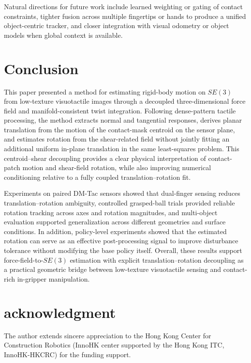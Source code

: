 \documentclass[letterpaper,10pt,journal,twoside]{IEEEtran}
\begin{document}
Natural directions for future work include learned weighting or gating of contact constraints, tighter fusion across multiple fingertips or hands to produce a unified object-centric tracker, and closer integration with visual odometry or object models when global context is available.

\section{Conclusion}
\label{sec:conclusion}

This paper presented a method for estimating rigid-body motion on $SE(3)$ from low-texture visuotactile images through a decoupled three-dimensional force field and manifold-consistent twist integration. Following dense-pattern tactile processing, the method extracts normal and tangential responses, derives planar translation from the motion of the contact-mask centroid on the sensor plane, and estimates rotation from the shear-related field without jointly fitting an additional uniform in-plane translation in the same least-squares problem. This centroid--shear decoupling provides a clear physical interpretation of contact-patch motion and shear-field rotation, while also improving numerical conditioning relative to a fully coupled translation--rotation fit.

Experiments on paired DM-Tac sensors showed that dual-finger sensing reduces translation--rotation ambiguity, controlled grasped-ball trials provided reliable rotation tracking across axes and rotation magnitudes, and multi-object evaluation supported generalization across different geometries and surface conditions. In addition, policy-level experiments showed that the estimated rotation can serve as an effective post-processing signal to improve disturbance tolerance without modifying the base policy itself. Overall, these results support force-field-to-$SE(3)$ estimation with explicit translation--rotation decoupling as a practical geometric bridge between low-texture visuotactile sensing and contact-rich in-gripper manipulation.

\section*{acknowledgment}

The author extends sincere appreciation to the Hong Kong Center for Construction Robotics (InnoHK center supported by the Hong Kong ITC, InnoHK-HKCRC) for the funding support.



\end{document}
